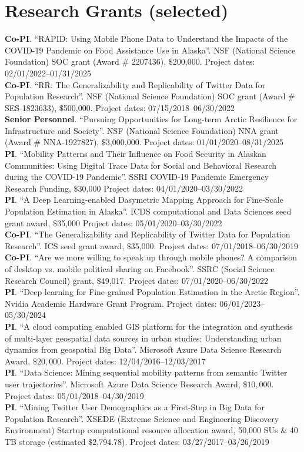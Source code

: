 \documentclass[11pt, a4paper]{article}
\begin{document}
\section*{Research Grants (selected)}
\textbf{Co-PI}. ``RAPID: Using Mobile Phone Data to Understand the Impacts of the COVID-19 Pandemic on Food Assistance Use in Alaska''. NSF (National Science Foundation) SOC grant (Award \# 2207436), $\$$200,000. Project dates: 02/01/2022--01/31/2025\\
\textbf{Co-PI}. ``RR: The Generalizability and Replicability of Twitter Data for Population Research''. NSF (National Science Foundation) SOC grant (Award \# SES-1823633), $\$$500,000. Project dates: 07/15/2018--06/30/2022\\
\textbf{Senior Personnel}. ``Pursuing Opportunities for Long-term Arctic Resilience for Infrastructure and Society''. NSF (National Science Foundation) NNA grant (Award \# NNA-1927827), $\$$3,000,000. Project dates: 01/01/2020--08/31/2025\\
\textbf{PI}. ``Mobility Patterns and Their Influence on Food Security in Alaskan Communities: Using Digital Trace Data for Social and Behavioral Research during the COVID-19 Pandemic''. SSRI COVID-19 Pandemic Emergency Research Funding, $\$$30,000 Project dates: 04/01/2020--03/30/2022\\
\textbf{PI}. ``A Deep Learning-enabled Dasymetric Mapping Approach for Fine-Scale Population Estimation in Alaska''. ICDS computational and Data Sciences seed grant award, $\$$35,000 Project dates: 05/01/2020--03/30/2022\\
\textbf{Co-PI}. ``The Generalizability and Replicability of Twitter Data for Population Research''. ICS seed grant award, $\$$35,000. Project dates: 07/01/2018--06/30/2019\\
\textbf{Co-PI}. ``Are we more willing to speak up through mobile phones?  A comparison of desktop vs. mobile political sharing on Facebook''. SSRC (Social Science Research Council) grant, $\$$49,017. Project dates: 07/01/2020--06/30/2022\\
\textbf{PI}. ``Deep learning for Fine-grained Population Estimation in the Arctic Region''. Nvidia Academic Hardware Grant Program. Project dates: 06/01/2023--05/30/2024\\
\textbf{PI}. ``A cloud computing enabled GIS platform for the integration and synthesis of multi-layer geospatial data sources in urban studies: Understanding urban dynamics from geospatial Big Data''. Microsoft Azure Data Science Research Award, $\$20,000$. Project dates: 12/04/2016--12/03/2017\\
\textbf{PI}. ``Data Science: Mining sequential mobility patterns from semantic Twitter user trajectories''. Microsoft Azure Data Science Research Award, $\$10,000$. Project dates: 05/01/2018--04/30/2019\\
\textbf{PI}. ``Mining Twitter User Demographics as a First-Step in Big Data for Population Research''. XSEDE (Extreme Science and Engineering Discovery Environment) Startup computational resource allocation award, 50,000 SUs $\&$ 40 TB storage (estimated $\$$2,794.78). Project dates: 03/27/2017--03/26/2019
\end{document}
